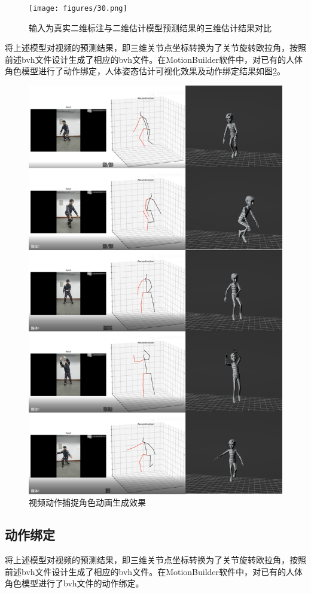 \begin{figure}[h]
	\centering
	\texttt{[image: figures/30.png]}
	\caption{输入为真实二维标注与二维估计模型预测结果的三维估计结果对比}
	\label{fig:f30}
\end{figure}

将上述模型对视频的预测结果，即三维关节点坐标转换为了关节旋转欧拉角，按照前述bvh文件设计生成了相应的bvh文件。在MotionBuilder软件中，对已有的人体角色模型进行了动作绑定，人体姿态估计可视化效果及动作绑定结果如图\ref{fig:f31}。

\begin{figure}[h]
	\centering
	\includegraphics[scale=0.4]{figures/31.png}
	\caption{视频动作捕捉角色动画生成效果}
	\label{fig:f31}
\end{figure}



\subsection{动作绑定}{}
将上述模型对视频的预测结果，即三维关节点坐标转换为了关节旋转欧拉角，按照前述bvh文件设计生成了相应的bvh文件。在MotionBuilder软件中，对已有的人体角色模型进行了bvh文件的动作绑定。